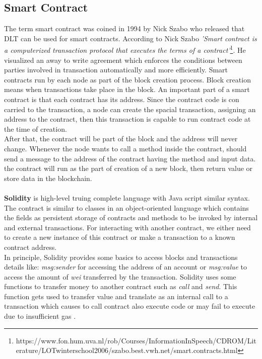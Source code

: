 \subsection{Smart Contract}
 The term smart contract was coined in 1994 by Nick Szabo \cite{Szabo} who released that DLT can be used for smart contracts. 
According to Nick Szabo \textit{'Smart contract is a computerized transaction protocol that executes the terms of  a contract'}\footnote{https://www.fon.hum.uva.nl/rob/Courses/InformationInSpeech/CDROM/Literature/LOTwinterschool2006/szabo.best.vwh.net/smart.contracts.html}. He visualized an away to write agreement which enforces the conditions between parties involved in transaction automatically and more efficiently.
Smart contracts run by each node as part of the block creation process. Block creation means when transactions take place in the block.
An important part of a smart contract is that each contract has its address. Since the contract code is con carried to the transaction, a node can create the spacial transaction, assigning an address to the contract, then this transaction is capable to run contract code at the time of creation.\\
After that, the contract will be part of the block and the address will never change. Whenever the node wants to call a method inside the contract, should send a message to the address of the contract having the method and input data.
the contract will run as the part of creation of a new block, then return value or store data in the blockchain\cite{Payrott}.\\
\\
\textbf{Solidity} is high-level truing complete language with Java script similar syntax. The contract is similar to classes in an object-oriented language which contains the fields as persistent storage of contracts and methods to be invoked by internal and external transactions. For interacting with another contract, we either need to create a new instance of this contract or make a transaction to a known contract address.\\
In principle, Solidity provides some basics to access blocks and transactions details like: \textit{msg:sender} for accessing the address of an account or \textit{msg:value} to access the amount of \textit{wei} transferred by the transaction. Solidity uses some functions to transfer money to another contract such as \textit{call} and \textit{send}. This function gets used to transfer value and translate as an internal call to a transaction which causes to call contract also execute code or may fail to execute due to insufficient gas \cite{Ilya}.

